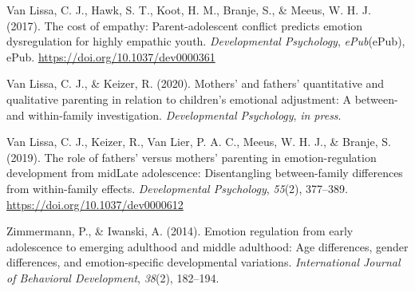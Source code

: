\documentclass[
  english,
  man]{apa6}
\begin{document}
\leavevmode\hypertarget{ref-vanlissaCostEmpathyParentadolescent2017}{}%
Van Lissa, C. J., Hawk, S. T., Koot, H. M., Branje, S., \& Meeus, W. H. J. (2017). The cost of empathy: Parent-adolescent conflict predicts emotion dysregulation for highly empathic youth. \emph{Developmental Psychology}, \emph{ePub}(ePub), ePub. \url{https://doi.org/10.1037/dev0000361}

\leavevmode\hypertarget{ref-vanlissaMothersFathersQuantitative2020}{}%
Van Lissa, C. J., \& Keizer, R. (2020). Mothers' and fathers' quantitative and qualitative parenting in relation to children's emotional adjustment: A between- and within-family investigation. \emph{Developmental Psychology}, \emph{in press}.

\leavevmode\hypertarget{ref-vanlissaRoleFathersMothers2019}{}%
Van Lissa, C. J., Keizer, R., Van Lier, P. A. C., Meeus, W. H. J., \& Branje, S. (2019). The role of fathers' versus mothers' parenting in emotion-regulation development from midLate adolescence: Disentangling between-family differences from within-family effects. \emph{Developmental Psychology}, \emph{55}(2), 377--389. \url{https://doi.org/10.1037/dev0000612}

\leavevmode\hypertarget{ref-zimmermannEmotionRegulationEarly2014}{}%
Zimmermann, P., \& Iwanski, A. (2014). Emotion regulation from early adolescence to emerging adulthood and middle adulthood: Age differences, gender differences, and emotion-specific developmental variations. \emph{International Journal of Behavioral Development}, \emph{38}(2), 182--194.

\endgroup
\end{document}
